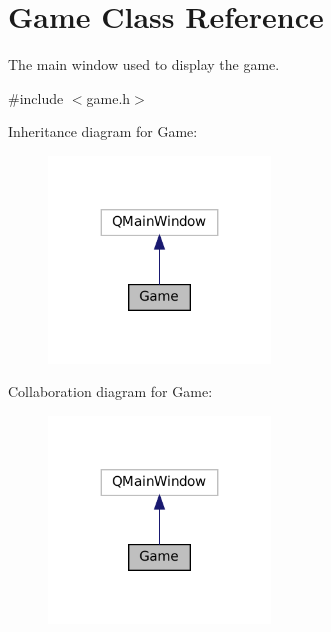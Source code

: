 \hypertarget{class_game}{}\section{Game Class Reference}
\label{class_game}


The main window used to display the game.  




{\ttfamily \#include $<$game.\+h$>$}



Inheritance diagram for Game\+:
\nopagebreak
\begin{figure}[H]
\begin{center}
\leavevmode
\includegraphics[width=167pt]{class_game__inherit__graph}
\end{center}
\end{figure}


Collaboration diagram for Game\+:
\nopagebreak
\begin{figure}[H]
\begin{center}
\leavevmode
\includegraphics[width=167pt]{class_game__coll__graph}
\end{center}
\end{figure}

